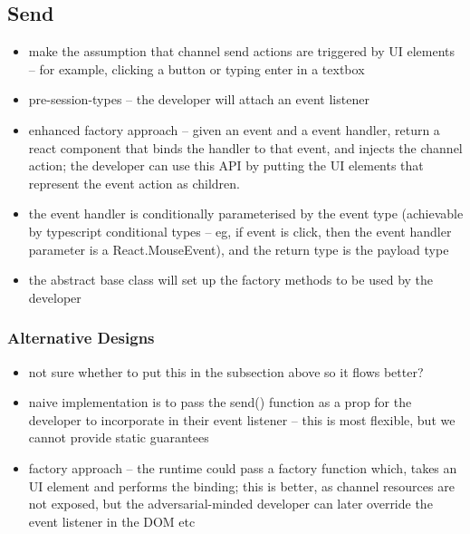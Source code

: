\subsection{Send}
\begin{itemize}
\item make the assumption that channel send actions are triggered by UI elements -- for example, clicking a button or typing enter in a textbox
\item pre-session-types -- the developer will attach an event listener
\item enhanced factory approach -- given an event and a event handler, return a react component that binds the handler to that event, and injects the channel action; the developer can use this API by putting the UI elements that represent the event action as children.
\item the event handler is conditionally parameterised by the event type (achievable by typescript conditional types -- eg, if event is click, then the event handler parameter is a React.MouseEvent), and the return type is the payload type
\item the abstract base class will set up the factory methods to be used by the developer
\end{itemize}

\subsubsection{Alternative Designs}
\begin{itemize}
\item not sure whether to put this in the subsection above so it flows better?
\item naive implementation is to pass the send() function as a prop for the developer to incorporate in their event listener -- this is most flexible, but we cannot provide static guarantees
\item factory approach -- the runtime could pass a factory function which, takes an UI element and performs the binding; this is better, as channel resources are not exposed, but the adversarial-minded developer can later override the event listener in the DOM etc
\end{itemize}

